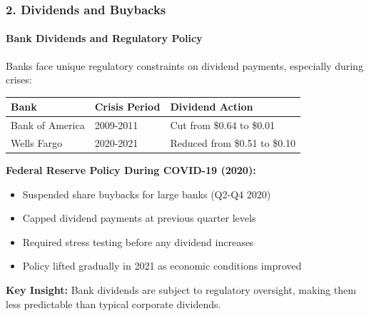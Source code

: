 \documentclass{beamer}
\begin{document}
\begin{frame}[t]
    \frametitle{2. Dividends and Buybacks}
    \framesubtitle{Bank Dividends and Regulatory Policy}

    Banks face unique regulatory constraints on dividend payments, especially during crises:

    \begin{table}
        \centering
        \begin{tabular}{|l|l|l|}
        \hline
        \textbf{Bank} & \textbf{Crisis Period} & \textbf{Dividend Action} \\
        \hline
        Bank of America & 2009-2011 & Cut from \$0.64 to \$0.01 \\
        \hline
        Wells Fargo & 2020-2021 & Reduced from \$0.51 to \$0.10 \\
        \hline
        \end{tabular}
    \end{table}

    \textbf{Federal Reserve Policy During COVID-19 (2020):}
    \begin{itemize}
        \item Suspended share buybacks for large banks (Q2-Q4 2020)
        \item Capped dividend payments at previous quarter levels
        \item Required stress testing before any dividend increases
        \item Policy lifted gradually in 2021 as economic conditions improved
    \end{itemize}

    \textbf{Key Insight:} Bank dividends are subject to regulatory oversight, making them less predictable than typical corporate dividends.

\end{frame}
\end{document}
